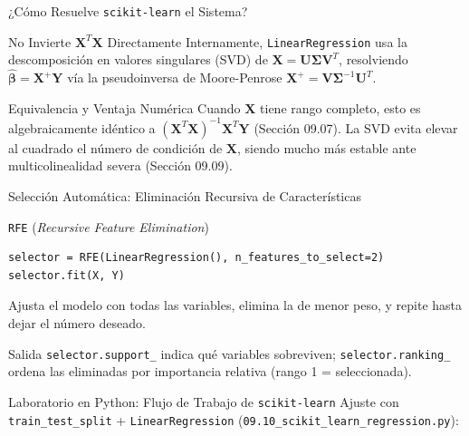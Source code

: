 \documentclass[10pt, aspectratio=169]{beamer}
\begin{document}
\begin{frame}{¿Cómo Resuelve \texttt{scikit-learn} el Sistema?}
  \footnotesize
  \begin{block}{No Invierte $\mathbf{X}^T\mathbf{X}$ Directamente}
    Internamente, \texttt{LinearRegression} usa la descomposición en valores singulares (SVD) de $\mathbf{X}=\mathbf{U}\boldsymbol\Sigma\mathbf{V}^T$, resolviendo $\hat{\boldsymbol\beta}=\mathbf{X}^+\mathbf{Y}$ vía la pseudoinversa de Moore-Penrose $\mathbf{X}^+=\mathbf{V}\boldsymbol\Sigma^{-1}\mathbf{U}^T$.
  \end{block}
  \pause

  \vspace{0.1cm}
  \begin{alertblock}{Equivalencia y Ventaja Numérica}
    Cuando $\mathbf{X}$ tiene rango completo, esto es algebraicamente idéntico a $(\mathbf{X}^T\mathbf{X})^{-1}\mathbf{X}^T\mathbf{Y}$ (Sección 09.07). La SVD evita elevar al cuadrado el número de condición de $\mathbf{X}$, siendo mucho más estable ante multicolinealidad severa (Sección 09.09).
  \end{alertblock}
\end{frame}

\begin{frame}[fragile]{Selección Automática: Eliminación Recursiva de Características}
  \footnotesize
  \begin{block}{\texttt{RFE} (\emph{Recursive Feature Elimination})}
    \begin{verbatim}
selector = RFE(LinearRegression(), n_features_to_select=2)
selector.fit(X, Y)
    \end{verbatim}
    Ajusta el modelo con todas las variables, elimina la de menor peso, y repite hasta dejar el número deseado.
  \end{block}
  \pause

  \vspace{0.1cm}
  \begin{alertblock}{Salida}
    \texttt{selector.support\_} indica qué variables sobreviven; \texttt{selector.ranking\_} ordena las eliminadas por importancia relativa (rango 1 = seleccionada).
  \end{alertblock}
\end{frame}

\begin{frame}[fragile]{Laboratorio en Python: Flujo de Trabajo de \texttt{scikit-learn}}
  \scriptsize
  Ajuste con \texttt{train\_test\_split} + \texttt{LinearRegression} (\texttt{09.10\_scikit\_learn\_regression.py}):
  {
  }
\end{frame}
\end{document}

